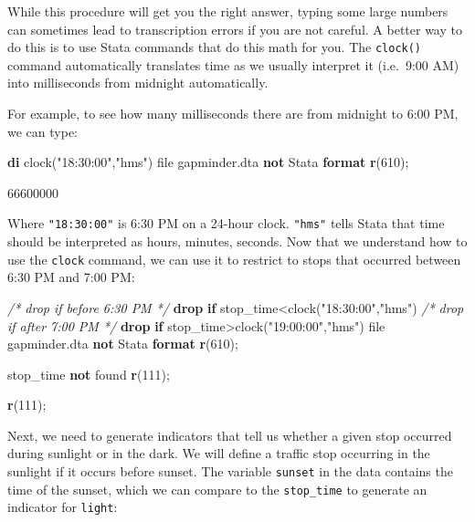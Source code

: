 \documentclass[
]{book}
\newenvironment{Shaded}{\begin{snugshade}}{\end{snugshade}}
\newcommand{\CommentTok}[1]{\textcolor[rgb]{0.56,0.35,0.01}{\textit{#1}}}
\newcommand{\FunctionTok}[1]{\textcolor[rgb]{0.13,0.29,0.53}{\textbf{#1}}}
\newcommand{\KeywordTok}[1]{\textcolor[rgb]{0.13,0.29,0.53}{\textbf{#1}}}
\newcommand{\NormalTok}[1]{#1}
\newcommand{\StringTok}[1]{\textcolor[rgb]{0.31,0.60,0.02}{#1}}
\begin{document}
While this procedure will get you the right answer, typing some large numbers can sometimes lead to transcription errors if you are not careful. A better way to do this is to use Stata commands that do this math for you. The \texttt{clock()} command automatically translates time as we usually interpret it (i.e.~9:00 AM) into milliseconds from midnight automatically.

For example, to see how many milliseconds there are from midnight to 6:00 PM, we can type:

\begin{Shaded}
\begin{Highlighting}[]
  \KeywordTok{di}\NormalTok{ clock(}\StringTok{"18:30:00"}\NormalTok{,}\StringTok{"hms"}\NormalTok{)}
\NormalTok{file gapminder.dta }\KeywordTok{not}\NormalTok{ Stata }\KeywordTok{format}
\FunctionTok{r}\NormalTok{(610);}


\NormalTok{66600000}
\end{Highlighting}
\end{Shaded}

Where \texttt{"18:30:00"} is 6:30 PM on a 24-hour clock. \texttt{"hms"} tells Stata that time should be interpreted as hours, minutes, seconds. Now that we understand how to use the \texttt{clock} command, we can use it to restrict to stops that occurred between 6:30 PM and 7:00 PM:

\begin{Shaded}
\begin{Highlighting}[]
\CommentTok{/* drop if before 6:30 PM */}
\KeywordTok{drop} \KeywordTok{if}\NormalTok{ stop\_time\textless{}clock(}\StringTok{"18:30:00"}\NormalTok{,}\StringTok{"hms"}\NormalTok{)}
\CommentTok{/* drop if after 7:00 PM */}
\KeywordTok{drop} \KeywordTok{if}\NormalTok{ stop\_time\textgreater{}clock(}\StringTok{"19:00:00"}\NormalTok{,}\StringTok{"hms"}\NormalTok{) }
\NormalTok{file gapminder.dta }\KeywordTok{not}\NormalTok{ Stata }\KeywordTok{format}
\FunctionTok{r}\NormalTok{(610);}


\NormalTok{stop\_time }\KeywordTok{not}\NormalTok{ found}
\FunctionTok{r}\NormalTok{(111);}

\FunctionTok{r}\NormalTok{(111);}
\end{Highlighting}
\end{Shaded}

Next, we need to generate indicators that tell us whether a given stop occurred during sunlight or in the dark. We will define a traffic stop occurring in the sunlight if it occurs before sunset. The variable \texttt{sunset} in the data contains the time of the sunset, which we can compare to the \texttt{stop\_time} to generate an indicator for \texttt{light}:
\end{document}
